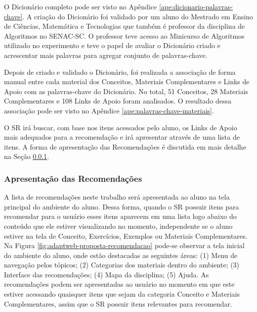 O Dicionário completo pode ser visto no Apêndice \ref{ape:dicionario-palavras-chave}. A criação do Dicionário foi validado
por um aluno do Mestrado em Ensino de Ciências, Matemática e Tecnologias que também é professor da disciplina de
Algoritmos no SENAC-SC. O professor teve acesso ao Minicurso de Algoritmos utilizado no experimento
e teve o papel de avaliar o Dicionário criado e acrescentar mais palavras para agregar conjunto de palavras-chave.

Depois de criado e validado o Dicionário, foi realizada a associação de forma manual entre cada material dos Conceitos,
Materiais Complementares e Links de Apoio com as palavras-chave do Dicionário. No total, 51 Conceitos, 28 Materiais
Complementares e 108 Links de Apoio foram analisados. O resultado dessa associação pode ser visto no Apêndice \ref{ape:palavras-chave-materiais}.

O SR irá buscar, com base nos itens acessados pelo aluno, os Links de Apoio mais adequados
para a recomendação e irá apresentar através de uma lista de itens. A forma de apresentação das Recomendações é discutida
em mais detalhe na Seção \ref{subsection:apresentacao-recomendacoes}.

\subsubsection{Apresentação das Recomendações}\label{subsection:apresentacao-recomendacoes}

A lista de recomendações neste trabalho será apresentada ao aluno na tela principal do ambiente do aluno. Dessa forma,
quando o SR possuir itens para recomendar para o usuário esses itens aparecem em uma lista logo abaixo do conteúdo que
ele estiver visualizando no momento, independente se o aluno estiver na tela de Conceito, Exercícios, Exemplos ou
Materiais Complementares. Na Figura \ref{fig:adaptweb-proposta-recomendacao} pode-se observar a tela inicial do ambiente do
aluno, onde estão destacadas as seguintes áreas: (1) Menu de navegação pelos tópicos; (2) Categorias dos materiais dentro
do ambiente; (3) Interface das recomendações; (4) Mapa da disciplina; (5) Ajuda. As recomendações podem ser apresentadas ao usuário no momento em que este estiver acessando
quaisquer itens que sejam da categoria Conceito e Materiais Complementares, assim que o SR possuir itens relevantes para recomendar.

